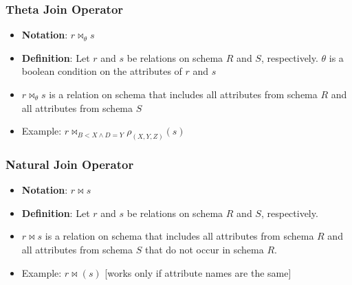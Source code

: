 \subsubsection{Theta Join Operator}
\begin{itemize}[label=\(\rhd\)]
    \item \textbf{Notation}: $r \bowtie_\theta s$
    \item \textbf{Definition}: Let $r$ and $s$ be relations on schema $R$ and $S$, respectively. $\theta$ is a boolean condition on the attributes of $r$ and $s$
    \item $r \bowtie_\theta s$ is a relation on schema that includes all attributes from schema $R$ and all attributes from schema $S$
    \item Example: $r \bowtie_{B<X\land D = Y} \rho_{(X,Y,Z)} (s)$
\end{itemize}

\subsubsection{Natural Join Operator}
\begin{itemize}[label=\(\rhd\)]
    \item \textbf{Notation}: $r \bowtie s$
    \item \textbf{Definition}: Let $r$ and $s$ be relations on schema $R$ and $S$, respectively.
    \item $r \bowtie s$ is a relation on schema that includes all attributes from schema $R$ and all attributes from schema $S$ that do not occur in schema $R$.
    \item Example: $r \bowtie (s)$ [works only if attribute names are the same]
\end{itemize}

